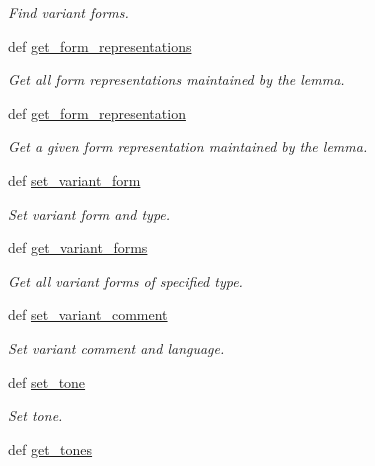 \begin{DoxyCompactItemize}
\begin{DoxyCompactList}\small\item\em Find variant forms. \end{DoxyCompactList}\item 
def \hyperlink{classlmf_1_1src_1_1morphology_1_1lemma_1_1_lemma_aaafc76e4a436188c2ac07417b02e530d}{get\+\_\+form\+\_\+representations}
\begin{DoxyCompactList}\small\item\em Get all form representations maintained by the lemma. \end{DoxyCompactList}\item 
def \hyperlink{classlmf_1_1src_1_1morphology_1_1lemma_1_1_lemma_a71c4c7715794ecd41e5176485f6d7f65}{get\+\_\+form\+\_\+representation}
\begin{DoxyCompactList}\small\item\em Get a given form representation maintained by the lemma. \end{DoxyCompactList}\item 
def \hyperlink{classlmf_1_1src_1_1morphology_1_1lemma_1_1_lemma_a16942d5bd7973fc19eee27a68789dcf5}{set\+\_\+variant\+\_\+form}
\begin{DoxyCompactList}\small\item\em Set variant form and type. \end{DoxyCompactList}\item 
def \hyperlink{classlmf_1_1src_1_1morphology_1_1lemma_1_1_lemma_a6c88624eac96d5660adfda8bf9368164}{get\+\_\+variant\+\_\+forms}
\begin{DoxyCompactList}\small\item\em Get all variant forms of specified type. \end{DoxyCompactList}\item 
def \hyperlink{classlmf_1_1src_1_1morphology_1_1lemma_1_1_lemma_a8d090ef91e9c98ef77d429b3d7296022}{set\+\_\+variant\+\_\+comment}
\begin{DoxyCompactList}\small\item\em Set variant comment and language. \end{DoxyCompactList}\item 
def \hyperlink{classlmf_1_1src_1_1morphology_1_1lemma_1_1_lemma_a094ea5bc786ebf4356bbb1e33c418b92}{set\+\_\+tone}
\begin{DoxyCompactList}\small\item\em Set tone. \end{DoxyCompactList}\item 
def \hyperlink{classlmf_1_1src_1_1morphology_1_1lemma_1_1_lemma_a02afd08362639bdbbac98b35c533375f}{get\+\_\+tones}

\end{DoxyCompactItemize}
